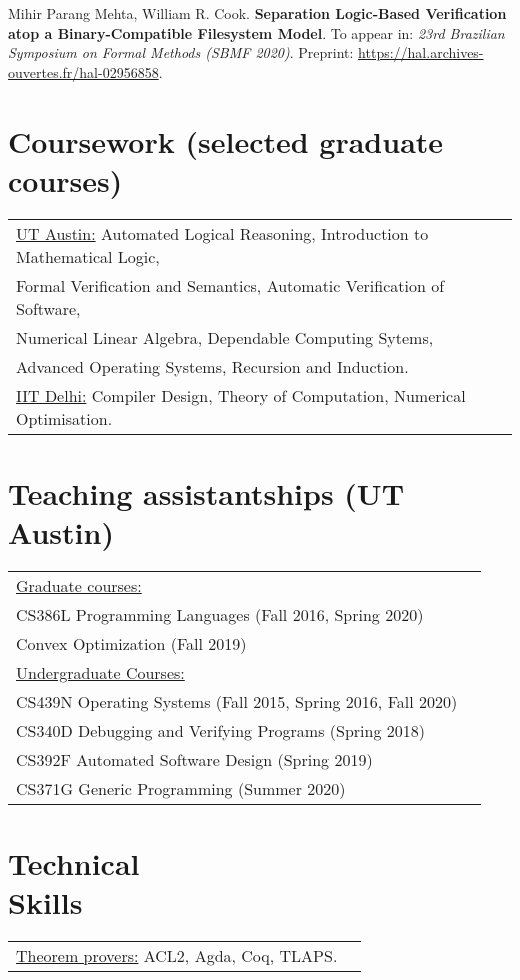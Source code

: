 \documentclass[margin]{res}
\begin{document}
\begin{resume}
  Mihir Parang Mehta, William R. Cook. {\bf Separation Logic-Based
    Verification atop a Binary-Compatible Filesystem Model}. To appear
  in: \textit{23rd Brazilian Symposium on Formal Methods (SBMF
    2020)}. Preprint:
  \url{https://hal.archives-ouvertes.fr/hal-02956858}.

\section{Coursework (selected graduate courses)}
\begin{tabular}{l p{3in}}
  \underline{UT Austin:} Automated Logical Reasoning, Introduction to
  Mathematical Logic, \\ Formal Verification and Semantics, Automatic
  Verification of Software,\\ Numerical Linear Algebra, Dependable
  Computing Sytems, \\Advanced Operating Systems, Recursion and Induction. \\
  \underline{IIT Delhi:} Compiler Design,
  Theory of Computation, Numerical Optimisation.
\end{tabular}

\section{Teaching assistantships (UT Austin)}
\begin{tabular}{l p{3in}}
  \underline{Graduate courses:} \\
  CS386L Programming Languages (Fall 2016, Spring 2020) \\
  Convex Optimization (Fall 2019) \\
  \underline{Undergraduate Courses:} \\
  CS439N Operating Systems (Fall 2015, Spring 2016, Fall 2020) \\
  CS340D Debugging and Verifying Programs (Spring 2018) \\
  CS392F Automated Software Design (Spring 2019) \\
  CS371G Generic Programming (Summer 2020)
\end{tabular}

\section{Technical \\ Skills}
   \begin{tabular}{l p{3in}}
    \underline{Theorem provers:} ACL2, Agda, Coq, TLAPS. \\


\end{tabular}
\end{resume}
\end{document}
